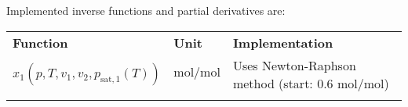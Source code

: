 %
Implemented inverse functions and partial derivatives are:
%
\begin{longtable}[l]{l|l|p{7.5cm}}
	\toprule
	\addlinespace
	\textbf{Function} & \textbf{Unit} &	\textbf{Implementation} \\
	\addlinespace
	\midrule
	\endhead
	
	\bottomrule
	\endfoot
	\bottomrule
	\endlastfoot
	\addlinespace
	
	$x_1(p,T,v_1,v_2,p_\mathrm{sat,1}(T))$& $\si{\mole\per\mole}$ & Uses Newton-Raphson method (start: 0.6 $\si{\mole\per\mole}$) \\
	
	\addlinespace
\end{longtable}
%

